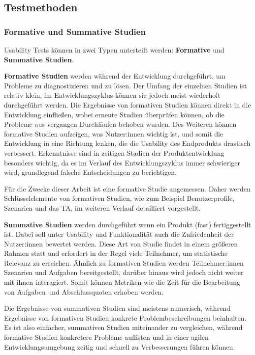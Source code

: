 
\subsection{Testmethoden}

\subsubsection{Formative und Summative Studien}
\label{sec:formative-summative}
Usability Tests können in zwei Typen unterteilt werden: \textbf{Formative} und \textbf{Summative
  Studien}.

\textbf{Formative Studien} werden während der Entwicklung durchgeführt, um Probleme zu diagnostizieren und zu lösen. Der Umfang der einzelnen Studien ist relativ klein, im Entwicklungszyklus können sie jedoch meist wiederholt durchgeführt werden. Die Ergebnisse von formativen Studien können direkt in die Entwicklung einfließen, wobei erneute Studien überprüfen können, ob die Probleme aus vergangen Durchläufen behoben wurden. Des Weiteren können formative Studien aufzeigen, was Nutzer:innen wichtig ist, und somit die Entwicklung in eine Richtung lenken, die die Usability des Endprodukts drastisch verbessert. Erkenntnisse sind in zeitigen Stadien der Produktentwicklung besonders wichtig, da es im Verlauf des Entwicklungszyklus immer schwieriger wird, grundlegend falsche Entscheidungen zu berichtigen.

Für die Zwecke dieser Arbeit ist eine formative Studie angemessen. Daher werden Schlüsselelemente von formativen Studien, wie zum Beispiel Benutzerprofile, Szenarien und das \acl{TA}, im weiteren Verlauf detailliert vorgestellt.

\textbf{Summative Studien} werden durchgeführt wenn ein Produkt (fast) fertiggestellt ist. Dabei soll unter Usability und Funktionalität auch die Zufriedenheit der Nutzer:innen bewertet werden. Diese Art von Studie findet in einem größeren Rahmen statt und erfordert in der Regel viele Teilnehmer, um statistische Relevanz zu erreichen. Ähnlich zu formativen Studien werden Teilnehmer:innen Szenarien und Aufgaben bereitgestellt, darüber hinaus wird jedoch nicht weiter mit ihnen interagiert. Somit können Metriken wie die Zeit für die Bearbeitung von Aufgaben und Abschlussquoten erhoben werden.

Die Ergebnisse von summativen Studien sind meistens numerisch, während Ergebnisse von formativen Studien konkrete Problembeschreibungen beinhalten. Es ist also einfacher, summativen Studien miteinander zu vergleichen, während formative Studien konkretere Probleme auflisten und in einer agilen Entwicklungsumgebung zeitig und schnell zu Verbesserungen führen können.

